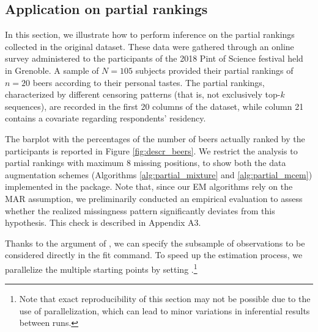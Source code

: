 \subsection{Application on partial rankings}
\label{subsec:est_partial}

In this section, we illustrate how to perform inference on the partial rankings collected in the original  dataset. 
These data were gathered through an online survey administered to the participants of the 2018 Pint of Science festival held in Grenoble. A sample of $N = 105$ subjects provided their partial rankings of $n=20$ beers according to their personal tastes. The partial rankings, characterized by different censoring patterns (that is, not exclusively top-$k$ sequences), are recorded in the first 20 columns of the dataset, while column 21 contains a covariate regarding respondents' residency. 

The barplot with the percentages of the number of beers actually ranked by the participants is reported in Figure \ref{fig:descr_beers}. We restrict the analysis to partial rankings with maximum 8 missing positions, to show both the data augmentation schemes (Algorithms \ref{alg:partial_mixture} and \ref{alg:partial_mcem}) implemented in the package. {Note that, since our EM algorithms rely on the MAR assumption, we preliminarily conducted an empirical evaluation to assess whether the realized missingness pattern significantly deviates from this hypothesis. This check is described in Appendix A3.}

Thanks to the  argument of , we can specify the subsample of observations to be considered directly in the fit command.
To speed up the estimation process, we parallelize the multiple starting points by setting  .\footnote{Note that exact reproducibility of this section may not be possible due to the use of parallelization, which can lead to minor variations in inferential results between runs.}

